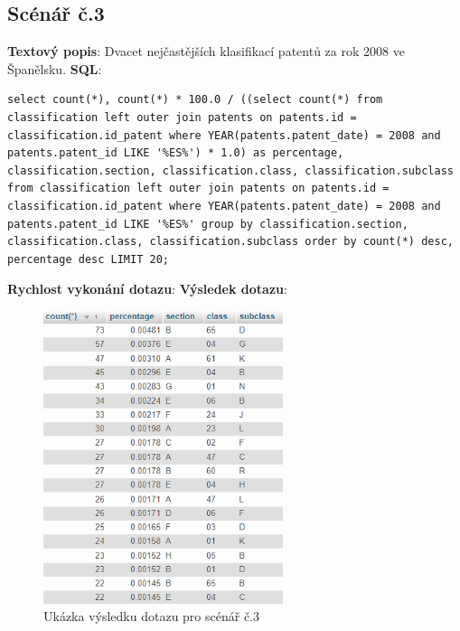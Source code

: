 \subsection{Scénář č.3}
\textbf{Textový popis}: Dvacet nejčastějších klasifikací patentů za rok 2008 ve Španělsku.
\newline
\textbf{SQL}:
\begin{lstlisting}[label = {lst:elements_a}]
select count(*), count(*) * 100.0 / ((select count(*) from classification left outer join patents on patents.id = classification.id_patent where YEAR(patents.patent_date) = 2008 and patents.patent_id LIKE '%ES%') * 1.0) as percentage, classification.section, classification.class, classification.subclass from classification left outer join patents on patents.id = classification.id_patent where YEAR(patents.patent_date) = 2008 and patents.patent_id LIKE '%ES%' group by classification.section, classification.class, classification.subclass order by count(*) desc, percentage desc LIMIT 20;
\end{lstlisting}
\textbf{Rychlost vykonání dotazu}: 
\newline
\textbf{Výsledek dotazu}:
\begin{figure}[H]
\centering
\includegraphics[width=7cm]{img/scenare/scenar_3}
\caption{Ukázka výsledku dotazu pro scénář č.3}
\label{fig:scenar3}
\end{figure}

